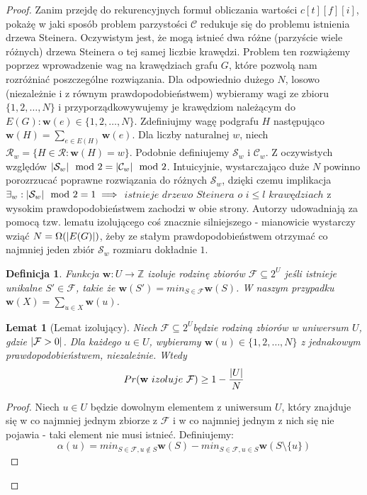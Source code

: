 \documentclass[12pt, oneside]{report}
\newtheorem{lemma}{Lemat}
\newtheorem{definition}{Definicja}
\begin{document}
\begin{proof}
Zanim przejdę do rekurencyjnych formuł obliczania wartości $c[t][f][i]$, pokażę w jaki sposób problem parzystości $\mathcal{C}$ redukuje się do problemu istnienia drzewa Steinera. Oczywistym jest, że mogą istnieć dwa różne (parzyście wiele różnych) drzewa Steinera o tej samej liczbie krawędzi. Problem ten rozwiążemy poprzez wprowadzenie wag na krawędziach grafu $G$, które pozwolą nam rozróżniać poszczególne rozwiązania. 
Dla odpowiednio dużego $N$, losowo (niezależnie i z równym prawdopodobieństwem) wybieramy wagi ze zbioru $\{1,2,\dots,N\}$ i przyporządkowywujemy je krawędziom należącym do $E(G): \mathbf{w}(e) \in \{1,2,\dots,N\}$. Zdefiniujmy wagę podgrafu $H$ następująco $\mathbf{w}(H) = \sum_{e \in E(H)} \mathbf{w}(e)$. Dla liczby naturalnej $w$, niech $\mathcal{R}_w = \{H \in \mathcal{R} : \mathbf{w}(H) = w\}$. Podobnie definiujemy $\mathcal{S}_w$ i $\mathcal{C}_w$. Z oczywistych względów $\abs{\mathcal{S}_w} \mod 2 = \abs{\mathcal{C}_w} \mod 2$. Intuicyjnie, wystarczająco duże $N$ powinno porozrzucać poprawne rozwiązania do różnych $\mathcal{S}_w$, dzięki czemu implikacja $\exists_{w} :\abs{\mathcal{S}_w} \mod 2 = 1 \implies$ $istnieje$ $drzewo$ $Steinera$ $o$ $i \leq l$ $kraw\mbox{ę}dziach$ z wysokim prawdopodobieństwem zachodzi w obie strony. Autorzy udowadniają za pomocą tzw. lematu izolującego coś znacznie silniejszego - mianowicie wystarczy wziąć $N = \Omega(\abs{E(G)})$, żeby ze stałym prawdopodobieństwem otrzymać co najmniej jeden zbiór $\mathcal{S}_w$ rozmiaru dokładnie $1$.

\begin{definition}
Funkcja $\mathbf{w}: U \to \mathbb{Z}$ izoluje rodzinę zbiorów $\mathcal{F} \subseteq 2^U$ jeśli istnieje unikalne $S' \in \mathcal{F}$, takie że $\mathbf{w}(S') = min_{S \in \mathcal{F}} \mathbf{w}(S)$. W naszym przypadku $\mathbf{w}(X) = \sum_{u \in X} \mathbf{w}(u)$.
\end{definition}

\begin{lemma}[Lemat izolujący]
Niech $\mathcal{F} \subseteq 2^U$będzie rodziną zbiorów w uniwersum $U$, gdzie $\abs{\mathcal{F} > 0}$. Dla każdego $u \in U$, wybieramy $\mathbf{w}(u) \in \{1, 2, \ldots, N\}$ z jednakowym prawdopodobieństwem, niezależnie. Wtedy
$$Pr(\mathbf{w} \ izoluje \ \mathcal{F}) \geq 1 - \frac{\abs{U}}{N}$$
\end{lemma}

\begin{proof}
Niech $u \in U$ będzie dowolnym elementem z uniwersum $U$, który znajduje się w co najmniej jednym zbiorze z $\mathcal{F}$ i w co najmniej jednym z nich się nie pojawia - taki element nie musi istnieć. Definiujemy:
$$\alpha(u) = min_{S \in \mathcal{F}, u \notin S} \mathbf{w}(S) - min_{S \in \mathcal{F}, u \in S} \mathbf{w}(S \setminus \{u\})$$


\end{proof}
\end{proof}
\end{document}
